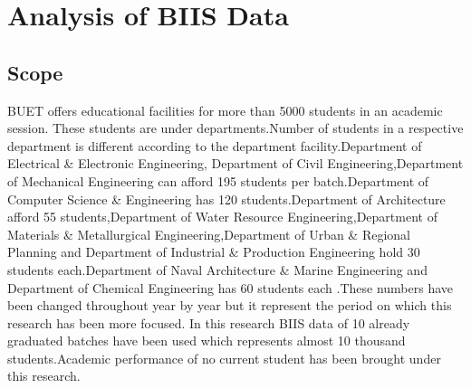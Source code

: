 \documentclass[a4paper,12pt]{book}
\begin{document}
\chapter{Analysis of BIIS Data} %

\label{Analysis of BIIS Data} %




\section{Scope}
BUET offers educational facilities for more than 5000 students in an academic session.
These students are under  departments.Number of students in a respective department is different according to the department facility.Department of Electrical \& Electronic Engineering, Department of Civil Engineering,Department of Mechanical Engineering can afford 195 students per batch.Department of Computer Science \& Engineering has 120 students.Department of Architecture afford 55 students,Department of Water Resource Engineering,Department of Materials \& Metallurgical Engineering,Department of Urban \& Regional Planning and Department of Industrial \& Production Engineering hold 30 students each.Department of Naval Architecture \& Marine Engineering and Department of Chemical Engineering has 60 students each \cite{buet}.These numbers have been changed throughout year by year but 
it represent the period on which this research has been more focused.
In this research BIIS data of 10 already graduated batches have been used which represents almost 10 thousand students.Academic performance of no current student has been brought under this research. 

\end{document}
